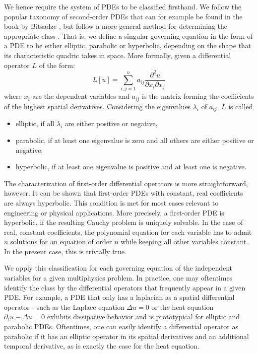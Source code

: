 \documentclass[asi,article,submit,moreauthors]{Definitions/mdpi}
\begin{document}
We hence require the system of PDEs to be classified firsthand. We follow the popular taxonomy of second-order PDEs that can for example be found in the book by Bitsadze \cite{bitsadze1988some}, but follow a more general method for determining the appropriate class \cite{pinchoverIntroductionPartialDifferential2005}. 
That is, we define a singular governing equation in the form of a PDE to be either elliptic, parabolic or hyperbolic, depending on the shape that its characteristic quadric takes in space.
More formally, given a differential operator $L$ of the form:
\begin{equation}\label{eq:pde-classification}
    L[u] = \sum\limits_{i,j=1}^{n} a_{ij} \frac{\partial^2 u}{\partial x_i \partial x_j}
\end{equation}
where $x_i$ are the dependent variables and $a_{ij}$ is the matrix forming the coefficients of the highest spatial derivatives.
Considering the eigenvalues $\lambda_i$ of $a_{ij}$, $L$ is called

\begin{itemize}
    \item elliptic, if all $\lambda_i$ are either positive or negative,
    \item parabolic, if at least one eigenvalue is zero and all others are either positive or negative,
    \item hyperbolic, if at least one eigenvalue is positive and at least one is negative.
\end{itemize}

The characterization of first-order differential operators is more straightforward, however.
It can be shown that first-order PDEs with constant, real coefficients are always hyperbolic.
This condition is met for most cases relevant to engineering or physical applications.
More precisely, a first-order PDE is hyperbolic, if the resulting Cauchy problem is uniquely solvable.
In the case of real, constant coefficients, the polynomial equation for each variable has to admit $n$ solutions for an equation of order $n$ while keeping all other variables constant.
In the present case, this is trivially true.

We apply this classification for each governing equation of the independent variables for a given multiphysics problem.
In practice, one may oftentimes identify the class by the differential operators that frequently appear in a given PDE.
For example, a PDE that only has a laplacian as a spatial differential operator - such as the Laplace equation $\Delta u = 0$ or the heat equation $\partial_t u - \Delta u = 0$ exhibits dissipative behavior and is prototypical for elliptic and parabolic PDEs.
Oftentimes, one can easily identify a differential operator as parabolic if it has an elliptic operator in its spatial derivatives and an additional temporal derivative, as is exactly the case for the heat equation.
\end{document}
